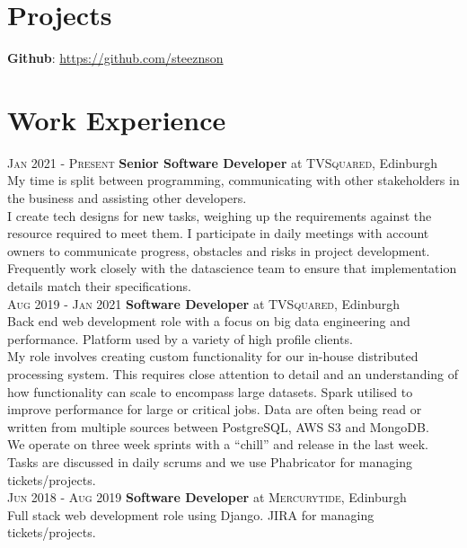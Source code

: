 \documentclass[14pt, a4paper]{extarticle}
\begin{document}
\begin{multicols}{2}
\section{Projects}
\noindent\textbf{Github}: \url{https://github.com/steeznson}

\columnbreak
\section{Work Experience}
\noindent\textsc{Jan 2021 - Present} \textbf{Senior Software Developer}
at \textsc{TVSquared}, Edinburgh\\
My time is split between programming, communicating with other stakeholders in the business and assisting other developers.\\
I create tech designs for new tasks, weighing up the requirements against the resource required to meet them. I participate in daily meetings with account owners to communicate progress, obstacles and risks in project development.\\
Frequently work closely with the datascience team to ensure that implementation details match their specifications.\\
\noindent\textsc{Aug 2019 - Jan 2021} \textbf{Software Developer}
at \textsc{TVSquared}, Edinburgh\\
Back end web development role with a focus on big data engineering and performance. Platform used by a variety of high profile clients.\\
My role involves creating custom functionality for our in-house distributed processing system. This requires close attention to detail and an understanding of how functionality can scale to encompass large datasets. Spark utilised to improve performance for large or critical jobs. Data are often being read or written from multiple sources between PostgreSQL, AWS S3 and MongoDB.\\
We operate on three week sprints with a ``chill'' and release in the last week.  Tasks are discussed in daily scrums and we use Phabricator for managing tickets/projects.\\
\noindent\textsc{Jun 2018 - Aug 2019} \textbf{Software Developer}
at \textsc{Mercurytide}, Edinburgh\\
Full stack web development role using Django. JIRA for managing tickets/projects.\\
\end{multicols}
\end{document}

